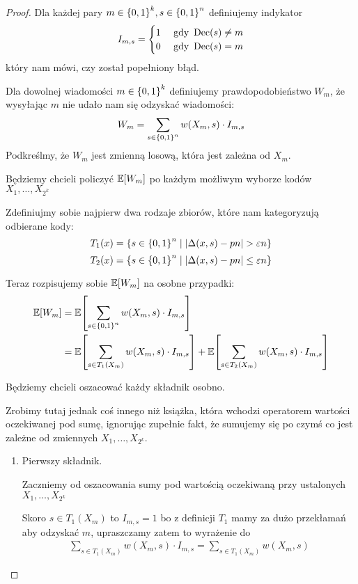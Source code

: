 \begin{proof}
    Dla każdej pary \(m \in \set{0, 1}^k, s \in \set{0, 1}^n \) definiujemy indykator
    \[
        I_{m, s} = \begin{cases}
            1 & \text{ gdy } \operatorname{Dec}(s) \neq m \\
            0 & \text{ gdy } \operatorname{Dec}(s) = m
        \end{cases}
    \]
    który nam mówi, czy został popełniony błąd.
    
    Dla dowolnej wiadomości \( m \in \set{0, 1}^k \) definiujemy prawdopodobieństwo \( W_m \), że wysyłając \( m \) nie udało nam się odzyskać wiadomości:
    \[
        W_m = \sum_{s \in \set{0,1}^n} w(X_m, s) \cdot I_{m, s}
    \]
    Podkreślmy, że \( W_m \) jest zmienną losową, która jest zależna od \( X_m \).
    
    Będziemy chcieli policzyć \( \expected{W_m} \) po każdym możliwym wyborze kodów \( X_1, \dots, X_{2^k} \)
    
    Zdefiniujmy sobie najpierw dwa rodzaje zbiorów, które nam kategoryzują odbierane kody:
    \[
        T_1(x) = \set{s \in \set{0,1}^n \mid \abs{\Delta(x, s) - pn} > \varepsilon n} 
    \]
    \[
        T_2(x) = \set{s \in \set{0,1}^n \mid \abs{\Delta(x, s) - pn} \leq \varepsilon n} 
    \]
    
    Teraz rozpisujemy sobie \( \expected{W_m} \) na osobne przypadki:
    \begin{align*}
        \expected{W_m}
        &= \expected{\sum_{s \in \set{0, 1}^n} w(X_m, s) \cdot I_{m, s}} \\
        &= \expected{\sum_{s \in T_1(X_m)} w(X_m, s) \cdot I_{m, s}}
        + \expected{\sum_{s \in T_2(X_m)} w(X_m, s) \cdot I_{m, s}}
    \end{align*}
    
    Będziemy chcieli oszacować każdy składnik osobno.
    
    Zrobimy tutaj jednak coś innego niż książka, która wchodzi operatorem wartości oczekiwanej pod sumę, ignorując zupełnie fakt, że sumujemy się po czymś co jest zależne od zmiennych \( X_1, \dots, X_{2^k} \).
    
    \begin{enumerate}
        \item Pierwszy składnik.
        
        Zaczniemy od oszacowania sumy pod wartością oczekiwaną przy ustalonych \( X_1, \dots, X_{2^k} \)
        
        Skoro \( s \in T_1(X_m) \) to \( I_{m, s} = 1 \) bo z definicji \( T_1 \) mamy za dużo przekłamań aby odzyskać \( m \), upraszczamy zatem to wyrażenie do
        \begin{align*}
            \sum_{s \in T_1(X_m)} w(X_m, s) \cdot I_{m, s} = \sum_{s \in T_1(X_m)} w(X_m, s)
        \end{align*}
        

\end{enumerate}
\end{proof}

